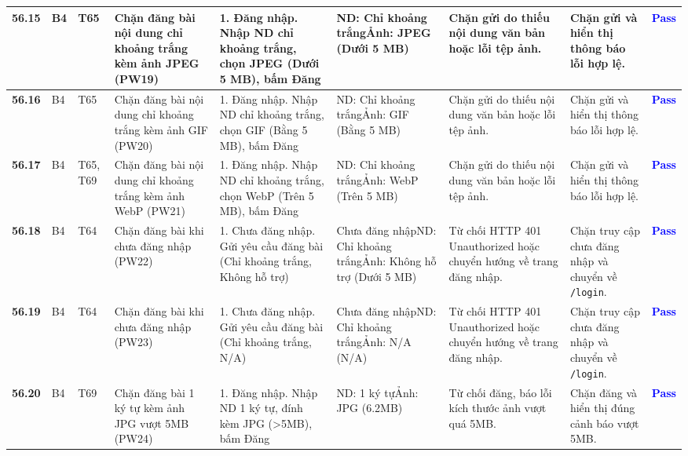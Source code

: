 \documentclass[11pt,a4paper]{article}
\begin{document}
\begin{longtable}{|C{0.85cm}|C{0.7cm}|C{0.95cm}|L{2.0cm}|L{3.0cm}|L{2.2cm}|L{2.6cm}|L{2.5cm}|C{0.85cm}|}
\textbf{56.15} & B4 & T65 & Chặn đăng bài nội dung chỉ khoảng trắng kèm ảnh JPEG (PW19) & 1. Đăng nhập. Nhập ND chỉ khoảng trắng, chọn JPEG (Dưới 5 MB), bấm Đăng & ND: Chỉ khoảng trắng\newline Ảnh: JPEG (Dưới 5 MB) & Chặn gửi do thiếu nội dung văn bản hoặc lỗi tệp ảnh. & Chặn gửi và hiển thị thông báo lỗi hợp lệ. & \textcolor{blue}{\textbf{Pass}} \\ \hline
\textbf{56.16} & B4 & T65 & Chặn đăng bài nội dung chỉ khoảng trắng kèm ảnh GIF (PW20) & 1. Đăng nhập. Nhập ND chỉ khoảng trắng, chọn GIF (Bằng 5 MB), bấm Đăng & ND: Chỉ khoảng trắng\newline Ảnh: GIF (Bằng 5 MB) & Chặn gửi do thiếu nội dung văn bản hoặc lỗi tệp ảnh. & Chặn gửi và hiển thị thông báo lỗi hợp lệ. & \textcolor{blue}{\textbf{Pass}} \\ \hline
\textbf{56.17} & B4 & T65, T69 & Chặn đăng bài nội dung chỉ khoảng trắng kèm ảnh WebP (PW21) & 1. Đăng nhập. Nhập ND chỉ khoảng trắng, chọn WebP (Trên 5 MB), bấm Đăng & ND: Chỉ khoảng trắng\newline Ảnh: WebP (Trên 5 MB) & Chặn gửi do thiếu nội dung văn bản hoặc lỗi tệp ảnh. & Chặn gửi và hiển thị thông báo lỗi hợp lệ. & \textcolor{blue}{\textbf{Pass}} \\ \hline
\textbf{56.18} & B4 & T64 & Chặn đăng bài khi chưa đăng nhập (PW22) & 1. Chưa đăng nhập. Gửi yêu cầu đăng bài (Chỉ khoảng trắng, Không hỗ trợ) & Chưa đăng nhập\newline ND: Chỉ khoảng trắng\newline Ảnh: Không hỗ trợ (Dưới 5 MB) & Từ chối HTTP 401 Unauthorized hoặc chuyển hướng về trang đăng nhập. & Chặn truy cập chưa đăng nhập và chuyển về \texttt{/login}. & \textcolor{blue}{\textbf{Pass}} \\ \hline
\textbf{56.19} & B4 & T64 & Chặn đăng bài khi chưa đăng nhập (PW23) & 1. Chưa đăng nhập. Gửi yêu cầu đăng bài (Chỉ khoảng trắng, N/A) & Chưa đăng nhập\newline ND: Chỉ khoảng trắng\newline Ảnh: N/A (N/A) & Từ chối HTTP 401 Unauthorized hoặc chuyển hướng về trang đăng nhập. & Chặn truy cập chưa đăng nhập và chuyển về \texttt{/login}. & \textcolor{blue}{\textbf{Pass}} \\ \hline
\textbf{56.20} & B4 & T69 & Chặn đăng bài 1 ký tự kèm ảnh JPG vượt 5MB (PW24) & 1. Đăng nhập. Nhập ND 1 ký tự, đính kèm JPG (>5MB), bấm Đăng & ND: 1 ký tự\newline Ảnh: JPG (6.2MB) & Từ chối đăng, báo lỗi kích thước ảnh vượt quá 5MB. & Chặn đăng và hiển thị đúng cảnh báo vượt 5MB. & \textcolor{blue}{\textbf{Pass}} \\ \hline

\end{longtable}
\end{document}
